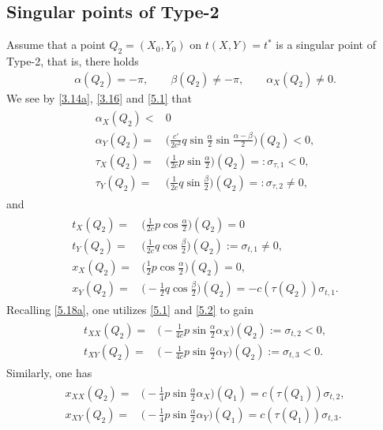 \documentclass[11pt,reqno]{article}
\newcommand{\fr}{\frac}
\numberwithin{equation}{section}
\begin{document}
\subsection{Singular points of Type-2}\label{S52}


Assume that a point $Q_2=(X_0,Y_0)$ on $t(X,Y)=t^*$ is a singular point of Type-2, that is, there holds
\begin{align}\label{5.1}
\alpha(Q_2)=-\pi,\qquad \beta(Q_2)\neq-\pi, \qquad \alpha_X(Q_2)\neq0.
\end{align}
We see by \eqref{3.14a}, \eqref{3.16} and \eqref{5.1} that
\begin{align}\label{5.2}
\begin{split}
\alpha_X(Q_2)<& 0 \\[4pt]
\alpha_Y(Q_2)=&\Big(\fr{c'}{2c^2}q\sin\fr{\alpha}{2}\sin\fr{\alpha-\beta}{2}\Big)(Q_2)<0, \\[4pt]
\tau_X(Q_2)=&\Big(\fr{1}{2c}p\sin\fr{\alpha}{2}\Big)(Q_2)=:\sigma_{\tau, 1}<0,\\[4pt]
\tau_Y(Q_2)=&\Big(\fr{1}{2c}q\sin\fr{\beta}{2}\Big)(Q_2)=:\sigma_{\tau, 2}\neq0,
\end{split}
\end{align}
and
\begin{align}\label{5.3}
\begin{split}
t_X(Q_2)=& \Big(\fr{1}{2c}p\cos\fr{\alpha}{2}\Big)(Q_2)=0 \\[4pt]
t_Y(Q_2)=&\Big(\fr{1}{2c}q\cos\fr{\beta}{2}\Big)(Q_2):=\sigma_{t,1}\neq0, \\[4pt]
x_X(Q_2)=&\Big(\fr{1}{2}p\cos\fr{\alpha}{2}\Big)(Q_2)=0,\\[4pt]
x_Y(Q_2)=&\Big(-\fr{1}{2}q\cos\fr{\beta}{2}\Big)(Q_2)=-c(\tau(Q_2))\sigma_{t,1}.
\end{split}
\end{align}
Recalling \eqref{5.18a}, one utilizes \eqref{5.1} and \eqref{5.2} to gain
\begin{align}\label{5.5}
\begin{split}
t_{XX}(Q_2)=& \Big(-\fr{1}{4c}p\sin\fr{\alpha}{2}\alpha_X\Big)(Q_2):=\sigma_{t,2}<0, \\[4pt]
t_{XY}(Q_2)=&\Big( -\fr{1}{4c}p\sin\fr{\alpha}{2}\alpha_Y\Big)(Q_2):=\sigma_{t,3}<0.
\end{split}
\end{align}
Similarly, one has
\begin{align}\label{5.6}
\begin{split}
x_{XX}(Q_2)=& \Big(-\fr{1}{4}p\sin\fr{\alpha}{2}\alpha_X\Big)(Q_1)=c(\tau(Q_1))\sigma_{t,2}, \\[4pt]
x_{XY}(Q_2)=&\Big( -\fr{1}{4}p\sin\fr{\alpha}{2}\alpha_Y\Big)(Q_1)=c(\tau(Q_1))\sigma_{t,3}.
\end{split}
\end{align}
\end{document}
